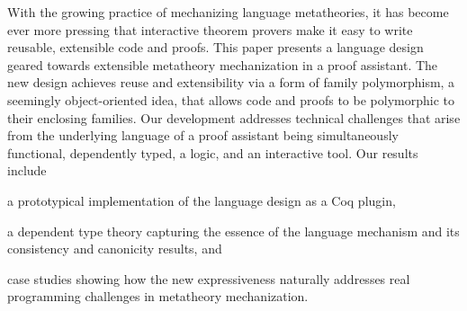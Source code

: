 
With the growing practice of mechanizing language metatheories,
it has become ever more pressing that interactive theorem provers 
make it easy to write reusable, extensible code and proofs.
%
This paper presents a language design geared towards extensible metatheory
mechanization in a proof assistant.
The new design achieves reuse and extensibility via a form of family
polymorphism, a seemingly object-oriented idea, that allows code and
proofs to be polymorphic to their enclosing families.
Our development addresses technical challenges that arise
from the underlying language of a proof assistant being simultaneously
functional, dependently typed, a logic, and an interactive tool.
%
Our results include
\begin{enumerate*}
\item a prototypical implementation of the language design as a Coq plugin,
\item a dependent type theory capturing the essence of the language mechanism
      and its consistency and canonicity results,
and 
\item case studies showing how the new expressiveness naturally addresses real
programming challenges in metatheory mechanization.
\end{enumerate*}